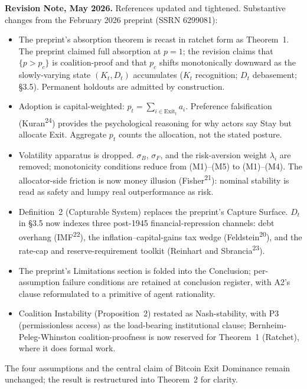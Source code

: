 \documentclass[12pt]{article}
\theoremstyle{definition}
\theoremstyle{remark}
\begin{document}
\newpage

\noindent\textbf{Revision Note, May 2026.}
References updated and tightened. Substantive changes from the February 2026 preprint (SSRN 6299081):

\smallskip

\begin{itemize}
\item The preprint's absorption theorem is recast in ratchet form as Theorem~1. The preprint claimed full absorption at $p = 1$; the revision claims that $\{p > p_c\}$ is coalition-proof and that $p_c$ shifts monotonically downward as the slowly-varying state $(K_t, D_t)$ accumulates ($K_t$ recognition; $D_t$ debasement; \S3.5). Permanent holdouts are admitted by construction.
\item Adoption is capital-weighted: $p_t = \sum_{i \in \text{Exit}_t} a_i$. Preference falsification (Kuran\textsuperscript{24}) provides the psychological reasoning for why actors say Stay but allocate Exit. Aggregate $p_t$ counts the allocation, not the stated posture.
\item Volatility apparatus is dropped. $\sigma_B$, $\sigma_F$, and the risk-aversion weight $\lambda_i$ are removed; monotonicity conditions reduce from (M1)--(M5) to (M1)--(M4). The allocator-side friction is now money illusion (Fisher\textsuperscript{21}): nominal stability is read as safety and lumpy real outperformance as risk.
\item Definition~2 (Capturable System) replaces the preprint's Capture Surface. $D_t$ in \S3.5 now indexes three post-1945 financial-repression channels: debt overhang (IMF\textsuperscript{22}), the inflation--capital-gains tax wedge (Feldstein\textsuperscript{20}), and the rate-cap and reserve-requirement toolkit (Reinhart and Sbrancia\textsuperscript{23}).
\item The preprint's Limitations section is folded into the Conclusion; per-assumption failure conditions are retained at conclusion register, with A2's clause reformulated to a primitive of agent rationality.
\item Coalition Instability (Proposition~2) restated as Nash-stability, with P3 (permissionless access) as the load-bearing institutional clause; Bernheim-Peleg-Whinston coalition-proofness is now reserved for Theorem~1 (Ratchet), where it does formal work.
\end{itemize}

\smallskip

\noindent The four assumptions and the central claim of Bitcoin Exit Dominance remain unchanged; the result is restructured into Theorem~2 for clarity.
\end{document}
